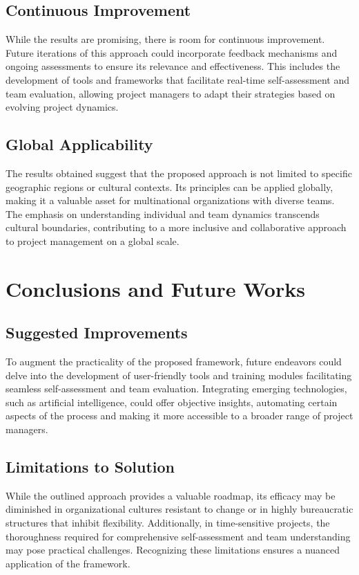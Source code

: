 \documentclass[11pt]{article}
\begin{document}
\subsection{Continuous Improvement}
While the results are promising, there is room for continuous improvement. Future iterations of this approach could incorporate feedback mechanisms and ongoing assessments to ensure its relevance and effectiveness. This includes the development of tools and frameworks that facilitate real-time self-assessment and team evaluation, allowing project managers to adapt their strategies based on evolving project dynamics.

\subsection{Global Applicability}
The results obtained suggest that the proposed approach is not limited to specific geographic regions or cultural contexts. Its principles can be applied globally, making it a valuable asset for multinational organizations with diverse teams. The emphasis on understanding individual and team dynamics transcends cultural boundaries, contributing to a more inclusive and collaborative approach to project management on a global scale.

\section{Conclusions and Future Works}
\subsection{Suggested Improvements}
To augment the practicality of the proposed framework, future endeavors could delve into the development of user-friendly tools and training modules facilitating seamless self-assessment and team evaluation. Integrating emerging technologies, such as artificial intelligence, could offer objective insights, automating certain aspects of the process and making it more accessible to a broader range of project managers.

\subsection{Limitations to Solution}
While the outlined approach provides a valuable roadmap, its efficacy may be diminished in organizational cultures resistant to change or in highly bureaucratic structures that inhibit flexibility. Additionally, in time-sensitive projects, the thoroughness required for comprehensive self-assessment and team understanding may pose practical challenges. Recognizing these limitations ensures a nuanced application of the framework.
\end{document}
